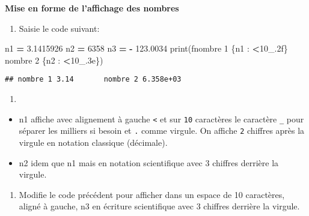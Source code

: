 \documentclass[
]{book}
\newenvironment{Shaded}{\begin{snugshade}}{\end{snugshade}}
\newcommand{\BuiltInTok}[1]{#1}
\newcommand{\DecValTok}[1]{\textcolor[rgb]{0.00,0.00,0.81}{#1}}
\newcommand{\FloatTok}[1]{\textcolor[rgb]{0.00,0.00,0.81}{#1}}
\newcommand{\NormalTok}[1]{#1}
\newcommand{\OperatorTok}[1]{\textcolor[rgb]{0.81,0.36,0.00}{\textbf{#1}}}
\newcommand{\SpecialCharTok}[1]{\textcolor[rgb]{0.00,0.00,0.00}{#1}}
\newcommand{\SpecialStringTok}[1]{\textcolor[rgb]{0.31,0.60,0.02}{#1}}
\providecommand{\tightlist}{%
  \setlength{\itemsep}{0pt}\setlength{\parskip}{0pt}}
\def\tightlist{}
\begin{document}
\textbf{Mise en forme de l'affichage des nombres}

\begin{enumerate}
\def\labelenumi{\arabic{enumi}.}
\tightlist
\item
  Saisie le code suivant:
\end{enumerate}

\begin{Shaded}
\begin{Highlighting}[]
\NormalTok{n1 }\OperatorTok{=} \FloatTok{3.1415926} 
\NormalTok{n2 }\OperatorTok{=} \DecValTok{6358}
\NormalTok{n3 }\OperatorTok{=} \OperatorTok{{-}} \FloatTok{123.0034}
\BuiltInTok{print}\NormalTok{(}\SpecialStringTok{f\textquotesingle{}nombre 1 }\SpecialCharTok{\{n1} \SpecialCharTok{:} \OperatorTok{\textless{}}\DecValTok{10}\SpecialCharTok{\_}\FloatTok{.2}\SpecialCharTok{f\}}\SpecialStringTok{ nombre 2 }\SpecialCharTok{\{n2} \SpecialCharTok{:} \OperatorTok{\textless{}}\DecValTok{10}\SpecialCharTok{\_}\FloatTok{.3}\SpecialCharTok{e\}}\SpecialStringTok{\textquotesingle{}}\NormalTok{) }
\end{Highlighting}
\end{Shaded}

\begin{verbatim}
## nombre 1 3.14       nombre 2 6.358e+03
\end{verbatim}

\begin{enumerate}
\def\labelenumi{\arabic{enumi}.}
\setcounter{enumi}{1}
\tightlist
\item
\end{enumerate}

\begin{itemize}
\tightlist
\item
  n1 affiche avec alignement à gauche \texttt{\textless{}} et sur \texttt{10} caractères le caractère \texttt{\_} pour séparer les milliers si besoin et \texttt{.} comme virgule. On affiche \texttt{2} chiffres après la virgule en notation classique (décimale).
\item
  n2 idem que n1 mais en notation scientifique avec 3 chiffres derrière la virgule.
\end{itemize}

\begin{enumerate}
\def\labelenumi{\arabic{enumi}.}
\setcounter{enumi}{2}
\tightlist
\item
  Modifie le code précédent pour afficher dans un espace de 10 caractères, aligné à gauche, n3 en écriture scientifique avec 3 chiffres derrière la virgule.
\end{enumerate}
\end{document}
